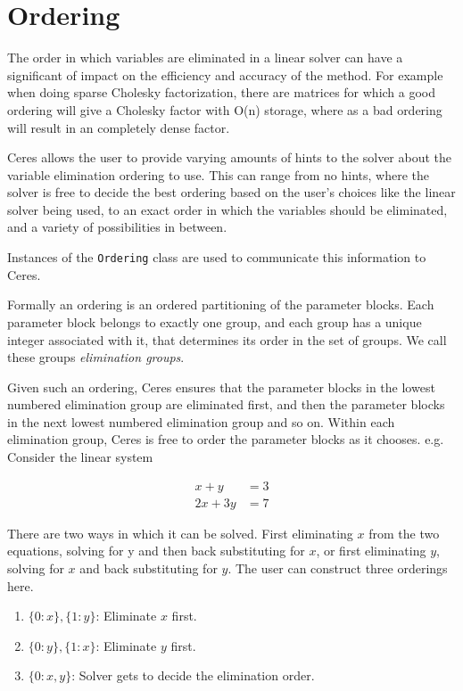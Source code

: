 \section{Ordering}
\label{sec:ordering}
The order in which variables are eliminated in a linear solver can
have a significant of impact on the efficiency and accuracy of the
method. For example when doing sparse Cholesky factorization, there are
matrices for which a good ordering will give a Cholesky factor with
O(n) storage, where as a bad ordering will result in an completely
dense factor.

Ceres allows the user to provide varying amounts of hints to the
solver about the variable elimination ordering to use. This can range
from no hints, where the solver is free to decide the best ordering
based on the user's choices like the linear solver being used, to an
exact order in which the variables should be eliminated, and a variety
of possibilities in between.

Instances of the \texttt{Ordering} class are used to communicate this
information to Ceres.

Formally an ordering is an ordered partitioning of the parameter
blocks. Each parameter block belongs to exactly one group, and
each group has a unique integer associated with it, that determines
its order in the set of groups. We call these groups {\em elimination
  groups}.

Given such an ordering, Ceres ensures that the parameter blocks in the
lowest numbered elimination group are eliminated first, and then the
parameter blocks in the next lowest numbered elimination group and so
on. Within each elimination group, Ceres is free to order the
parameter blocks as it chooses. e.g. Consider the linear system

\begin{align}
x + y &= 3\\
   2x + 3y &= 7
\end{align}

There are two ways in which it can be solved. First eliminating $x$
from the two equations, solving for y and then back substituting
for $x$, or first eliminating $y$, solving for $x$ and back substituting
for $y$. The user can construct three orderings here.

\begin{enumerate}
\item   $\{0: x\}, \{1: y\}$: Eliminate $x$ first.
\item  $\{0: y\}, \{1: x\}$: Eliminate $y$ first.
\item   $\{0: x, y\}$: Solver gets to decide the elimination order.
\end{enumerate}

